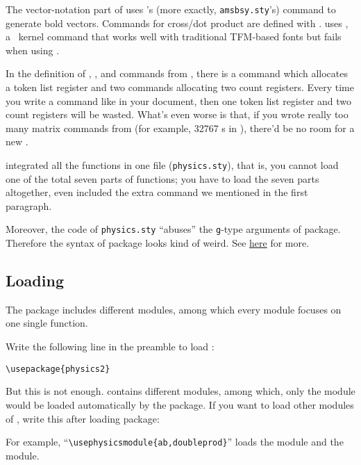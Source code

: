 \documentclass[11pt,letterpaper]{article}
\begin{document}
The vector-notation part of  uses 's (more exactly, 
\texttt{amsbsy.sty}'s)  command to generate bold vectors.
Commands for cross/dot product are defined with . 
 uses , a \LaTeXe\ kernel command that works
well with traditional TFM-based fonts but fails when using .

In the definition of , ,  and  commands
from , there is a  command which allocates a token
list register and two  commands allocating two count registers.
Every time you write a command like  in your document, then one token
list register and two count registers will be wasted. What's even worse is
that, if you wrote really too many matrix commands from  (for
example, 32767 s in ), there'd be no room for a new
.

 integrated all the functions in one file (\texttt{physics.sty}),
that is, you cannot load one of the total seven parts of functions; you have
to load the seven parts altogether, even included the extra 
command we mentioned in the first paragraph.

Moreover, the code of \texttt{physics.sty} ``abuses'' the \texttt{g}-type
arguments of  package. Therefore the syntax of  package
looks kind of weird. See \href{https://tex.stackexchange.com/questions/%
470819/macros-dv-and-pdv-eat-the-subsequent-parenthesis-argument/470842#470842}%
{here} for more.

\subsection{Loading }
The  package includes different modules, among which every module
focuses on one single function.

Write the following line in the preamble to load :
\begin{Verbatim}
\usepackage{physics2}
\end{Verbatim}
But this is not enough.  contains different modules, among which,
only the  module would be loaded automatically by the package.
If you want to load other modules of , write this after loading
 package:
\begin{displayed}
\end{displayed}
For example, ``\verb|\usephysicsmodule{ab,doubleprod}|'' loads the 
module and the  module.
\end{document}
